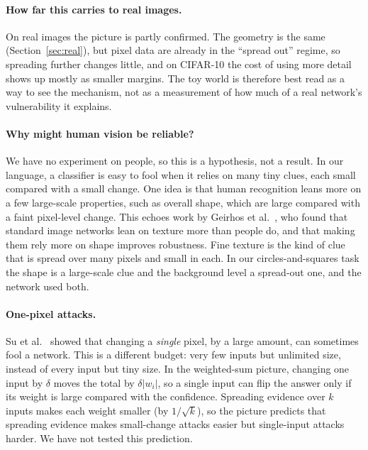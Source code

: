 \documentclass[11pt]{article}
\begin{document}
\paragraph{How far this carries to real images.} On real images the picture is partly confirmed. The geometry is the same (Section~\ref{sec:real}), but pixel data are already in the ``spread out'' regime, so spreading further changes little, and on CIFAR-10 the cost of using more detail shows up mostly as smaller margins. The toy world is therefore best read as a way to see the mechanism, not as a measurement of how much of a real network's vulnerability it explains.

\paragraph{Why might human vision be reliable?} We have no experiment on people, so this is a hypothesis, not a result. In our language, a classifier is easy to fool when it relies on many tiny clues, each small compared with a small change. One idea is that human recognition leans more on a few large-scale properties, such as overall shape, which are large compared with a faint pixel-level change. This echoes work by Geirhos et al.~\cite{geirhos2019}, who found that standard image networks lean on texture more than people do, and that making them rely more on shape improves robustness. Fine texture is the kind of clue that is spread over many pixels and small in each. In our circles-and-squares task the shape is a large-scale clue and the background level a spread-out one, and the network used both.

\paragraph{One-pixel attacks.} Su et al.~\cite{su2019} showed that changing a \emph{single} pixel, by a large amount, can sometimes fool a network. This is a different budget: very few inputs but unlimited size, instead of every input but tiny size. In the weighted-sum picture, changing one input by $\delta$ moves the total by $\delta|w_i|$, so a single input can flip the answer only if its weight is large compared with the confidence. Spreading evidence over $k$ inputs makes each weight smaller (by $1/\sqrt k$), so the picture predicts that spreading evidence makes small-change attacks easier but single-input attacks harder. We have not tested this prediction.
\end{document}
